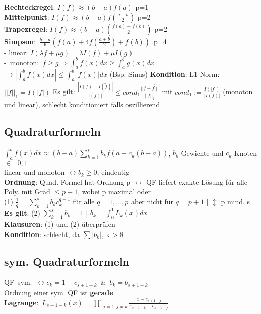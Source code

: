 \textbf{Rechteckregel}: $I(f) \approx (b-a)f(a)$ \hfill p=1\\
\textbf{Mittelpunkt}: $I(f) \approx (b-a)f(\frac{a+b}{2})$ \hfill p=2\\
\textbf{Trapezregel}: $I(f) \approx (b-a)(\frac{f(a) + f(b)}{2})$ \hfill p=2\\
\mbox{\textbf{Simpson}: $\frac{b-a}{6}(f(a) + 4f(\frac{a+b}{2}) + f(b))$ p=4}\\
- linear: $I(\lambda f + \mu g) = \lambda I(f) + \mu I(g)$\\
\mbox{- monoton: $f \geq g \Rightarrow \int_a^bf(x)dx \geq \int_a^bg(x)dx$}\\
$\rightarrow |\int_a^bf(x)dx| \leq \int_a^b|f(x)|dx$ (Bsp. Sinus)
\textbf{Kondition}: L1-Norm: $||f||_1 = I(|f|)$
Es gilt: $\frac{|I(f) - I(\widetilde{f})|}{|(f)|} \leq cond_1 \frac{||f-\widetilde{f||_1}}{||f||_1}$ mit $cond_1 := \frac{I(|f|)}{|I(f)|}$ (monoton und linear), schlecht konditioniert falls oszillierend
\subsection{Quadraturformeln}
$\int_a^bf(x)dx \approx (b-a)\sum_{k=1}^s b_kf(a + c_k(b-a))$, $b_k$ Gewichte und $c_k$ Knoten $\in [0,1]$\\
linear und monoton $\leftrightarrow b_k \geq 0$, eindeutig\\
\textbf{Ordnung}: Quad.-Formel hat Ordnung p $\leftrightarrow$ QF liefert exakte Lösung für alle Poly. mit Grad $\leq p - 1$, wobei p maximal oder \\
(1) $\frac{1}{q} = \sum_{k=1}^sb_kc_k^{q-1}$ für alle $q = 1, ..., p$ aber nicht für $q = p + 1$ | $\updownarrow$ p mind. s \\
\textbf{Es gilt}: (2) $\sum_{k=1}^s b_k = 1$ | $b_k = \int_0^1 L_k(x)dx$\\
\textbf{Klausuren}: (1) und (2) überprüfen\\
\textbf{Kondition}: schlecht, da $\sum|b_k|$, k > 8
\subsection{sym. Quadraturformeln}
\mbox{QF sym. $\leftrightarrow c_k = 1 - c_{s+1-k}$ \& $b_k = b_{s+1-k}$}\\
Ordnung einer sym. QF ist \textbf{gerade}\\
\mbox{\textbf{Lagrange}: $L_{s+1-k}(x) = \underset{j=1, j \neq k}{\prod^s} \frac{x - c_{s+1 - j}}{c_{s+1-k} - c_{s+1-j}}$}

